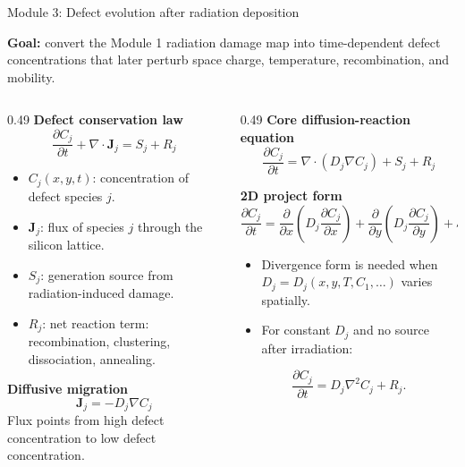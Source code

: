 \documentclass[aspectratio=169,8pt]{beamer}
\newcommand{\Jj}{\bm{J}_j}
\begin{document}
\begin{frame}{Module 3: Defect evolution after radiation deposition}
\scriptsize
\vspace{-1mm}
\begin{bluebox}
\centering\small
\textbf{Goal:} convert the Module 1 radiation damage map into time-dependent defect concentrations that later perturb space charge, temperature, recombination, and mobility.
\end{bluebox}

\vspace{1mm}
\begin{columns}[T,totalwidth=\textwidth]
\begin{column}{0.49\textwidth}
\textbf{Defect conservation law}
\begin{equation*}
\boxed{\frac{\partial C_j}{\partial t}+\nabla\cdot\Jj=S_j+R_j}
\end{equation*}
\scriptsize
\begin{itemize}\setlength\itemsep{0.2mm}
\item $C_j(x,y,t)$: concentration of defect species $j$.
\item $\Jj$: flux of species $j$ through the silicon lattice.
\item $S_j$: generation source from radiation-induced damage.
\item $R_j$: net reaction term: recombination, clustering, dissociation, annealing.
\end{itemize}

\vspace{1mm}
\textbf{Diffusive migration}
\begin{equation*}
\boxed{\Jj=-D_j\nabla C_j}
\end{equation*}
\scriptsize
Flux points from high defect concentration to low defect concentration.
\end{column}

\begin{column}{0.49\textwidth}
\textbf{Core diffusion-reaction equation}
\begin{equation*}
\boxed{\frac{\partial C_j}{\partial t}
=\nabla\cdot\left(D_j\nabla C_j\right)+S_j+R_j}
\end{equation*}

\textbf{2D project form}
\begin{equation*}
\boxed{
\frac{\partial C_j}{\partial t}
=\frac{\partial}{\partial x}\!\left(D_j\frac{\partial C_j}{\partial x}\right)
+\frac{\partial}{\partial y}\!\left(D_j\frac{\partial C_j}{\partial y}\right)
+S_j+R_j}
\end{equation*}
\scriptsize
\begin{itemize}\setlength\itemsep{0.2mm}
\item Divergence form is needed when $D_j=D_j(x,y,T,C_1,\ldots)$ varies spatially.
\item For constant $D_j$ and no source after irradiation:
\end{itemize}
\begin{equation*}
\frac{\partial C_j}{\partial t}=D_j\nabla^2 C_j+R_j.
\end{equation*}
\end{column}
\end{columns}


\end{frame}
\end{document}
